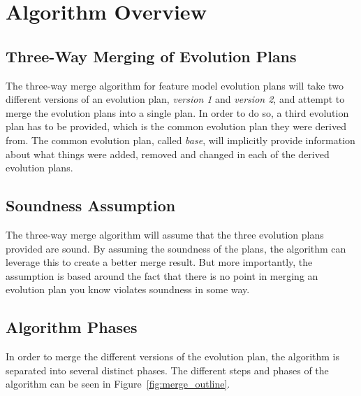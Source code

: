 \documentclass[a4paper,english]{ifimaster}
\begin{document}
\section{Algorithm Overview}%
\label{sec:algorithm_overview}

\subsection{Three-Way Merging of Evolution Plans}%
\label{sub:three_way_merging_of_evolution_plans}

The three-way merge algorithm for feature model evolution plans will take two different versions of an evolution plan, \textit{version 1} and \textit{version 2}, and attempt to merge the evolution plans into a single plan. In order to do so, a third evolution plan has to be provided, which is the common evolution plan they were derived from. The common evolution plan, called \textit{base}, will implicitly provide information about what things were added, removed and changed in each of the derived evolution plans.

\subsection{Soundness Assumption}%
\label{sub:soundness_assumption}

The three-way merge algorithm will assume that the three evolution plans provided are sound. By assuming the soundness of the plans, the algorithm can leverage this to create a better merge result. But more importantly, the assumption is based around the fact that there is no point in merging an evolution plan you know violates soundness in some way.

\subsection{Algorithm Phases}%
\label{sub:algorithm_phases}

In order to merge the different versions of the evolution plan, the algorithm is separated into several distinct phases. The different steps and phases of the algorithm can be seen in Figure~\ref{fig:merge_outline}.
\end{document}
